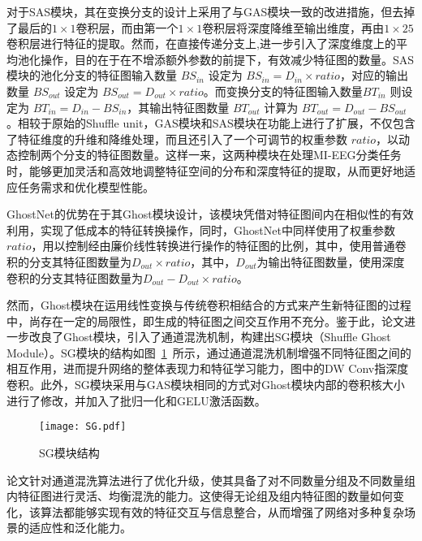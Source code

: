 对于SAS模块，其在变换分支的设计上采用了与GAS模块一致的改进措施，但去掉了最后的\(1\times1\)卷积层，而由第一个\(1\times1\)卷积层将深度降维至输出维度，再由\(1\times25\)卷积层进行特征的提取。然而，在直接传递分支上,进一步引入了深度维度上的平均池化操作，目的在于在不增添额外参数的前提下，有效减少特征图的数量。SAS模块的池化分支的特征图输入数量 \(BS_{in}\) 设定为 \(BS_{in} = D_{in} \times ratio\)，对应的输出数量 \(BS_{out}\) 设定为 \(BS_{out} = D_{out} \times ratio\)。而变换分支的特征图输入数量\(BT_{in}\) 则设定为 \(BT_{in} = D_{in} - BS_{in}\)，其输出特征图数量 \(BT_{out}\) 计算为 \(BT_{out} = D_{out} - BS_{out}\)。相较于原始的Shuffle unit，GAS模块和SAS模块在功能上进行了扩展，不仅包含了特征维度的升维和降维处理，而且还引入了一个可调节的权重参数  \(ratio\)，以动态控制两个分支的特征图数量。这样一来，这两种模块在处理MI-EEG分类任务时，能够更加灵活和高效地调整特征空间的分布和深度特征的提取，从而更好地适应任务需求和优化模型性能。

GhostNet的优势在于其Ghost模块设计，该模块凭借对特征图间内在相似性的有效利用，实现了低成本的特征转换操作，同时，GhostNet中同样使用了权重参数 \(ratio\)，用以控制经由廉价线性转换进行操作的特征图的比例，其中，使用普通卷积的分支其特征图数量为\(D_{out} \times ratio\)，其中，\(D_{out}\)为输出特征图数量，使用深度卷积的分支其特征图数量为\(D_{out}-D_{out} \times ratio\)。

然而，Ghost模块在运用线性变换与传统卷积相结合的方式来产生新特征图的过程中，尚存在一定的局限性，即生成的特征图之间交互作用不充分。鉴于此，论文进一步改良了Ghost模块，引入了通道混洗机制，构建出SG模块（Shuffle Ghost Module）。SG模块的结构如图~\ref{fig:sg}~所示，通过通道混洗机制增强不同特征图之间的相互作用，进而提升网络的整体表现力和特征学习能力，图中的DW Conv指深度卷积。此外，SG模块采用与GAS模块相同的方式对Ghost模块内部的卷积核大小进行了修改，并加入了批归一化和GELU激活函数。
\begin{figure}
    \centering
    \texttt{[image: SG.pdf]}
    \caption{SG模块结构}
    \label{fig:sg}
\end{figure}

论文针对通道混洗算法进行了优化升级，使其具备了对不同数量分组及不同数量组内特征图进行灵活、均衡混洗的能力。这使得无论组及组内特征图的数量如何变化，该算法都能够实现有效的特征交互与信息整合，从而增强了网络对多种复杂场景的适应性和泛化能力。

